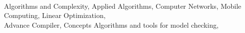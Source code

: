  \hfill \\[-0.2cm]
\hspace*{0.45cm} Algorithms and Complexity, Applied Algorithms, Computer Networks, Mobile Computing, Linear Optimization, \\
\hspace*{0.45cm}Advance Compiler, Concepts Algorithms and tools for model checking, \\[-0.3cm]

